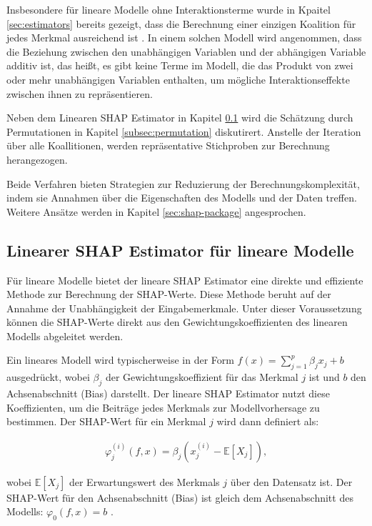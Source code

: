 Insbesondere für lineare Modelle ohne Interaktionsterme wurde in Kpaitel \ref{sec:estimators} bereits gezeigt,
dass die Berechnung einer einzigen Koalition für jedes Merkmal ausreichend ist \cite[S. 38]{Molnar_2023}.
In einem solchen Modell wird angenommen, dass die Beziehung zwischen den unabhängigen 
Variablen und der abhängigen Variable additiv ist, das heißt, es gibt keine Terme im Modell, 
die das Produkt von zwei oder mehr unabhängigen Variablen enthalten, um mögliche Interaktionseffekte 
zwischen ihnen zu repräsentieren.

Neben dem Linearen SHAP Estimator in Kapitel \ref{subsec:linear-shap-estimator} wird die Schätzung durch Permutationen in Kapitel 
\ref{subsec:permutation} diskutirert. Anstelle der Iteration über alle Koallitionen, werden repräsentative Stichproben zur Berechnung
herangezogen. 

Beide Verfahren bieten Strategien zur Reduzierung der Berechnungskomplexität, 
indem sie Annahmen über die Eigenschaften des Modells und der Daten treffen. 
Weitere Ansätze werden in Kapitel \ref{sec:shap-package} angesprochen.


\subsection{Linearer SHAP Estimator für lineare Modelle}
\label{subsec:linear-shap-estimator}

Für lineare Modelle bietet der lineare SHAP Estimator eine direkte und effiziente 
Methode zur Berechnung der SHAP-Werte. Diese Methode beruht auf der Annahme 
der Unabhängigkeit der Eingabemerkmale. Unter dieser Voraussetzung können 
die SHAP-Werte direkt aus den Gewichtungskoeffizienten des linearen Modells 
abgeleitet werden.

Ein lineares Modell wird typischerweise in der Form 
\( f(x) = \sum_{j=1}^{p} \beta_j x_j + b \) ausgedrückt, wobei \( \beta_j \) der 
Gewichtungskoeffizient für das Merkmal \( j \) ist und \( b \) den 
Achsenabschnitt (Bias) darstellt. Der lineare SHAP Estimator nutzt 
diese Koeffizienten, um die Beiträge jedes Merkmals zur Modellvorhersage 
zu bestimmen. Der SHAP-Wert für ein Merkmal \( j \) wird dann definiert als:

\begin{align}
    \label{eq:shap-single}
    \varphi_j^{(i)}(f, x) = \beta_j (x_j^{(i)} - \mathbb{E}[X_j]),
\end{align}

wobei \( \mathbb{E}[X_j] \) der Erwartungswert des Merkmals \( j \) über den 
Datensatz ist. Der SHAP-Wert für den Achsenabschnitt (Bias) ist gleich 
dem Achsenabschnitt des Modells: \( \varphi_0(f, x) = b \) \cite[S. 6]{NIPS2017_8a20a862}.

